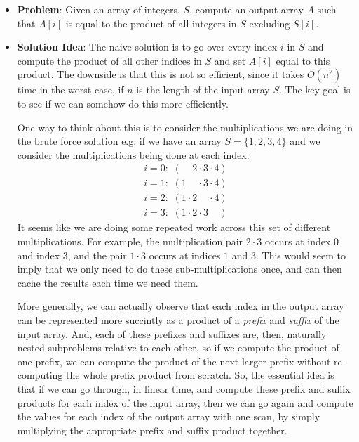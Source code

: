 \documentclass[10pt,a4paper]{article}
\begin{document}
\begin{itemize}
    \item \textbf{Problem}: Given an array of integers, $S$, compute an output array $A$ such that $A[i]$ is equal to the product of all integers in $S$ excluding $S[i]$.
    \item \textbf{Solution Idea}: The naive solution is to go over every index $i$ in $S$ and compute the product of all other indices in $S$ and set $A[i]$ equal to this product. The downside is that this is not so efficient, since it takes $O(n^2)$ time in the worst case, if $n$ is the length of the input array $S$. The key goal is to see if we can somehow do this more efficiently. 
    
    One way to think about this is to consider the multiplications we are doing in the brute force solution e.g. if we have an array $S=\{1,2,3,4\}$ and we consider the multiplications being done at each index:
    \begin{align*}
        i=0 : \, \, (\phantom{1 \cdot} 2 \cdot 3 \cdot 4) \\ 
        i=1 : \, \, (1 \phantom{1 \cdot} \cdot 3 \cdot 4) \\
        i=2 : \, \, (1 \cdot 2 \phantom{1 \cdot} \cdot 4) \\
        i=3 : \, \, (1 \cdot 2 \cdot 3 \phantom{1 \cdot})
    \end{align*}
    It seems like we are doing some repeated work across this set of different multiplications. For example, the multiplication pair $2 \cdot 3$ occurs at index $0$ and index $3$, and the pair $1 \cdot 3$ occurs at indices $1$ and $3$. This would seem to imply that we only need to do these sub-multiplications once, and can then cache the results each time we need them. 
    
    More generally, we can actually observe that each index in the output array can be represented more succintly as a product of a \textit{prefix} and \textit{suffix} of the input array. And, each of these prefixes and suffixes are, then, naturally nested subproblems relative to each other, so if we compute the product of one prefix, we can compute the product of the next larger prefix without re-computing the whole prefix product from scratch. So, the essential idea is that if we can go through, in linear time, and compute these prefix and suffix products for each index of the input array, then we can go again and compute the values for each index of the output array with one scan, by simply multiplying the appropriate prefix and suffix product together.


\end{itemize}
\end{document}
